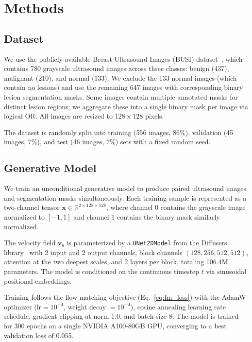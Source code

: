 \documentclass[twocolumn]{article}
\begin{document}
\section{Methods}
\label{sec:methods}

\subsection{Dataset}

We use the publicly available Breast Ultrasound Images (BUSI) dataset~\cite{al-dhabyani2020}, which contains 780 grayscale ultrasound images across three classes: benign (437), malignant (210), and normal (133). We exclude the 133 normal images (which contain no lesions) and use the remaining 647 images with corresponding binary lesion segmentation masks. Some images contain multiple annotated masks for distinct lesion regions; we aggregate these into a single binary mask per image via logical OR. All images are resized to $128 \times 128$ pixels.

The dataset is randomly split into training (556 images, 86\%), validation (45 images, 7\%), and test (46 images, 7\%) sets with a fixed random seed.

\subsection{Generative Model}

We train an unconditional generative model to produce paired ultrasound images and segmentation masks simultaneously. Each training sample is represented as a two-channel tensor $\mathbf{x} \in \mathbb{R}^{2 \times 128 \times 128}$, where channel 0 contains the grayscale image normalized to $[-1, 1]$ and channel 1 contains the binary mask similarly normalized.

The velocity field $\mathbf{v}_\theta$ is parameterized by a \texttt{UNet2DModel} from the Diffusers library~\cite{von-platen2022} with 2 input and 2 output channels, block channels $(128, 256, 512, 512)$, attention at the two deepest scales, and 2 layers per block, totaling 106.4M parameters. The model is conditioned on the continuous timestep $t$ via sinusoidal positional embeddings.

Training follows the flow matching objective (Eq.~\ref{eq:fm_loss}) with the AdamW optimizer ($\text{lr} = 10^{-4}$, weight decay $= 10^{-4}$), cosine annealing learning rate schedule, gradient clipping at norm 1.0, and batch size 8. The model is trained for 300 epochs on a single NVIDIA A100-80GB GPU, converging to a best validation loss of 0.055.
\end{document}
